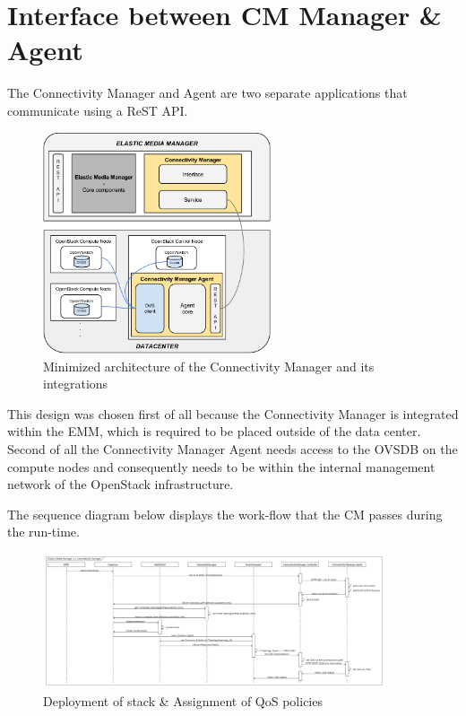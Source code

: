 \section{Interface between CM Manager \& Agent}

The Connectivity Manager and Agent are two separate applications that communicate using a ReST API. 

\begin{figure}[H]
\centering

\includegraphics[width=0.6\textwidth]{images/design/modular_architecture_cm_cma}

\caption{Minimized architecture of the Connectivity Manager and its integrations}
\end{figure}

This design was chosen first of all because the Connectivity Manager is integrated within the EMM, which is required to be placed outside of the data center. Second of all the Connectivity Manager Agent needs access to the OVSDB on the compute nodes and consequently needs to be within the internal management network of the OpenStack infrastructure.

The sequence diagram below displays the work-flow that the CM passes during the run-time.

\begin{figure}[H]
\centering

\includegraphics[width=0.9\textwidth]{images/design/sequence_diagram}

\caption{Deployment of stack \& Assignment of QoS policies}
\end{figure}

